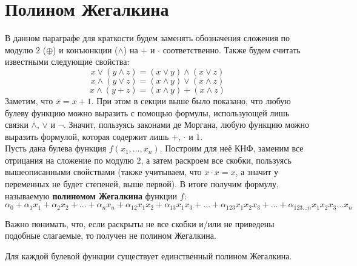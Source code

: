 \documentclass[11pt]{article}
\begin{document}
\section{Полином Жегалкина}

В данном параграфе для краткости будем заменять обозначения сложения по модулю $2$ ($\oplus$) и конъюнкции ($\land$) на 
$+$ и $\cdot$ соответственно. Также будем считать известными следующие свойства:
\[x \lor (y \land z) = (x \lor y) \land (x \lor z)\]
\[x \land (y \lor z) = (x \land y) \lor (x \land z)\]
\[x \land (y + z) = (x \land y) + (x \land z)\]
Заметим, что $\overline{x} = x + 1$. При этом в секции выше было показано, что любую булеву функцию 
можно выразить с помощью формулы, использующей лишь связки $\land$, $\lor$ и $\lnot$. Значит, пользуясь законами де Моргана, любую функцию 
можно выразить формулой, которая содержит лишь $+$, $\cdot$ и $1$.
\\
Пусть дана булева функция $f(x_1, \ldots, x_n)$. Построим для неё КНФ, заменим все отрицания на сложение по модулю $2$, а затем раскроем все скобки,
пользуясь вышеописанными свойствами (также учитываем, что $x \cdot x = x$, а значит у переменных не будет степеней, выше первой). В итоге получим формулу, 
называемую \textbf{полиномом Жегалкина} функции $f$:
\begin{equation*} \label{pol:1} \tag{$\ast$}
    \alpha_0 + \alpha_1 x_1 + \alpha_2 x_2 + \ldots + \alpha_n x_n + \alpha_{12} x_1 x_2 + \alpha_{13} x_1 x_3 + \ldots + \alpha_{123} x_1 x_2 x_3 + \ldots + \alpha_{123 \ldots n} x_1 x_2 x_3 \ldots x_n
\end{equation*}

\begin{remark}
    Важно понимать, что, если раскрыты не все скобки и/или не приведены подобные слагаемые, то получен не полином Жегалкина.
\end{remark}

\begin{theorem}
    Для каждой булевой функции существует единственный полином Жегалкина.
\end{theorem}
\end{document}
